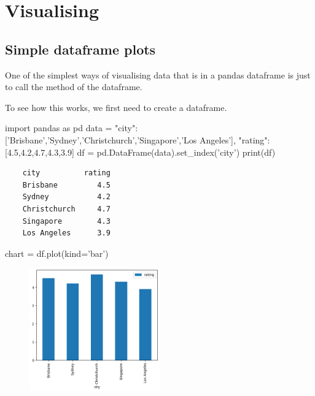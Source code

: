 \chapter{Visualising}
\label{chapter:visualising}

\section{Simple dataframe plots}

One of the simplest ways of visualising data that is in a pandas dataframe is just to call the  method of the dataframe.

To see how this works, we first need to create a dataframe.

\begin{pycode}
    import pandas as pd
    data = {"city":['Brisbane','Sydney','Christchurch','Singapore','Los Angeles'],
            "rating":[4.5,4.2,4.7,4.3,3.9]}
    df = pd.DataFrame(data).set_index('city')
    print(df)
\end{pycode}

\begin{verbatim}
    city          rating
    Brisbane         4.5
    Sydney           4.2
    Christchurch     4.7
    Singapore        4.3
    Los Angeles      3.9
\end{verbatim}


\begin{pycode}
    chart = df.plot(kind='bar')
\end{pycode}

\begin{figure}[!h]
    \includegraphics[width=0.5\textwidth]{graphics/simple_bar.png}
\end{figure}